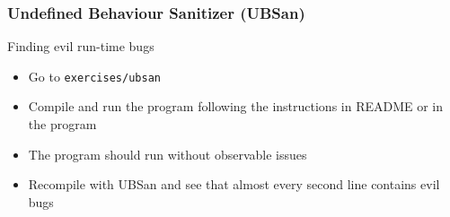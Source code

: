 \begin{frame}[fragile]
  \frametitle{Undefined Behaviour Sanitizer (UBSan)}
  \begin{exercise}{Finding evil run-time bugs}
    \begin{itemize}
      \item Go to \texttt{exercises/ubsan}
      \item Compile and run the program following the instructions in README or in the program
      \item The program should run without observable issues
      \item Recompile with UBSan and see that almost every second line contains evil bugs
    \end{itemize}
  \end{exercise}

\end{frame}
